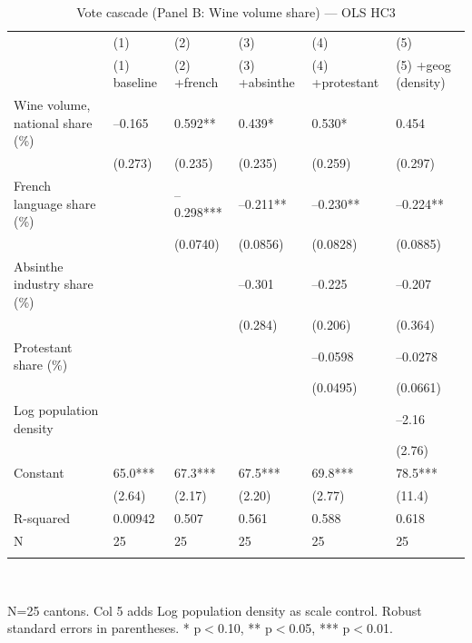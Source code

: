 \begin{table}[tbp] \centering
{}

\caption{Vote cascade (Panel B: Wine volume share) --- OLS HC3}
\label{tab:T2_X2_OLS}
\begin{tabularx}{\linewidth}{@{}lCCCCC@{}}

\toprule
&{(1)}&{(2)}&{(3)}&{(4)}&{(5)} \tabularnewline
 & (1) baseline & (2) +french & (3) +absinthe & (4) +protestant & (5) +geog (density) \tabularnewline 
\midrule \addlinespace[\belowrulesep]
Wine volume, national share (\%)&--0.165&0.592**&0.439*&0.530*&0.454 \tabularnewline
&(0.273)&(0.235)&(0.235)&(0.259)&(0.297) \tabularnewline
French language share (\%)&&--0.298***&--0.211**&--0.230**&--0.224** \tabularnewline
&&(0.0740)&(0.0856)&(0.0828)&(0.0885) \tabularnewline
Absinthe industry share (\%)&&&--0.301&--0.225&--0.207 \tabularnewline
&&&(0.284)&(0.206)&(0.364) \tabularnewline
Protestant share (\%)&&&&--0.0598&--0.0278 \tabularnewline
&&&&(0.0495)&(0.0661) \tabularnewline
Log population density&&&&&--2.16 \tabularnewline
&&&&&(2.76) \tabularnewline
Constant&65.0***&67.3***&67.5***&69.8***&78.5*** \tabularnewline
&(2.64)&(2.17)&(2.20)&(2.77)&(11.4) \tabularnewline
\midrule R-squared&0.00942&0.507&0.561&0.588&0.618 \tabularnewline
N&25&25&25&25&25 \tabularnewline
\bottomrule \addlinespace[\belowrulesep]

\end{tabularx}
\\ \parbox{\linewidth}{\footnotesize N=25 cantons. Col 5 adds Log population density as scale control. Robust standard errors in parentheses. * p\(<\)0.10, ** p\(<\)0.05, *** p\(<\)0.01.}
\end{table}
